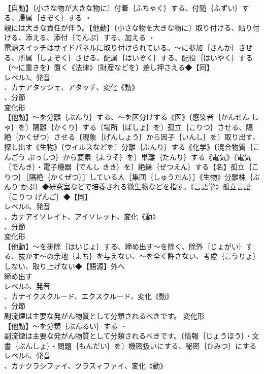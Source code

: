 \documentclass[8pt]{extreport}
\begin{document}
\begin{CJK}{UTF8}{min}
\\	【自動】〔小さな物が大きな物に〕付着｛ふちゃく｝する、付随｛ふずい｝する、帰属｛きぞく｝する ・
\\	親には大きな責任が伴う。【他動】〔小さな物を大きな物に〕取り付ける、貼り付ける、添える、添付｛てんぷ｝する、加える ・
\\	電源スイッチはサイドパネルに取り付けられている。～に参加｛さんか｝させる、所属｛しょぞく｝させる、配属｛はいぞく｝する、配役｛はいやく｝する〔～に重きを〕置く《法律》〔財産などを〕差し押さえる◆【同】
\\	レベル3、発音
\\	、カナアタッシェ、アタッチ、変化《動》
\\	、分節
\\	変化形 
\\	【他動】～を分離｛ぶんり｝する、～を区分けする《医》〔感染者｛かんせん しゃ｝を〕隔離｛かくり｝する〔場所｛ばしょ｝を〕孤立｛こりつ｝させる、隔絶｛かくぜつ｝させる〔現象｛げんしょう｝から因子｛いんし｝を〕取り出す、探し出す《生物》〔ウイルスなどを〕分離｛ぶんり｝する《化学》〔混合物質｛こんごう ぶっしつ｝から要素｛ようそ｝を〕単離｛たんり｝する《電気》〔電気｛でんき｝・電子機器｛でんし きき｝を〕絶縁｛ぜつえん｝する【名】孤立｛こりつ｝［隔絶｛かくぜつ｝］している人［集団｛しゅうだん｝］《生物》分離株｛ぶんり かぶ｝◆研究室などで培養される微生物などを指す。《言語学》孤立言語｛こりつ げんご｝◆【同】
\\	レベル6、発音
\\	、カナアイソレイト、アイソレット、変化《動》
\\	、分節
\\	変化形 
\\	【他動】～を排除｛はいじょ｝する、締め出す～を除く、除外｛じょがい｝する、抜かす～の余地｛よち｝を与えない、～を全く許さない、考慮｛こうりょ｝しない、取り上げない◆【語源】外へ
\\	締め出す
\\	レベル5、発音
\\	、カナイクスクルード、エクスクルード、変化《動》
\\	、分節
\\	副流煙は主要な発がん物質として分類されるべきです。	変化形 
\\	【他動】～を分類｛ぶんるい｝する ・
\\	副流煙は主要な発がん物質として分類されるべきです。〔情報｛じょうほう｝・文書｛ぶんしょ｝・問題｛もんだい｝を〕機密扱いにする、秘密｛ひみつ｝にするレベル6、発音
\\	、カナクラシファイ、クラスィファイ、変化《動》

\end{CJK}
\end{document}
